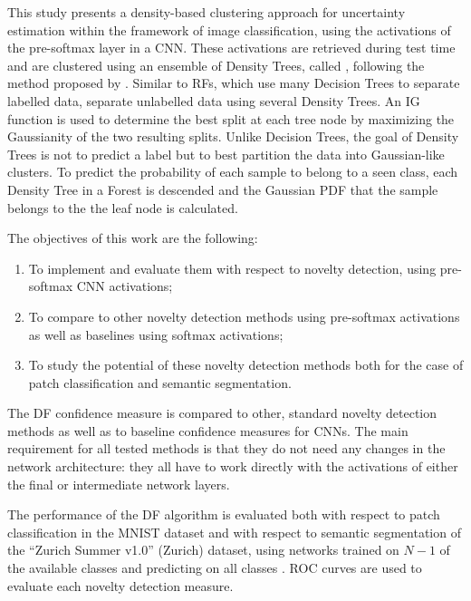 \documentclass[10pt]{article}
\begin{document}
This study presents a density-based clustering approach for uncertainty estimation within the framework of image classification, using the activations of the pre-softmax layer in a CNN. These activations are retrieved during test time and are clustered using an ensemble of Density Trees, called , following the method proposed by \textcite{decisionForests-MSR}. Similar to \glspl{RF}, which use many Decision Trees to separate labelled data,  separate unlabelled data using several Density Trees. An \gls{IG} function is used to determine the best split at each tree node by maximizing the Gaussianity of the two resulting splits. Unlike Decision Trees, the goal of Density Trees is not to predict a label but to best partition the data into Gaussian-like clusters. To predict the probability of each sample to belong to a seen class, each Density Tree in a Forest is descended and the Gaussian \acrfull{PDF} that the sample belongs to the the leaf node is calculated. 

The objectives of this work are the following:
\begin{enumerate}
    \item To implement  and evaluate them with respect to novelty detection, using pre-softmax \gls{CNN} activations;
    \item To compare  to other novelty detection methods using pre-softmax activations as well as baselines using softmax activations;
    \item To study the potential of these novelty detection methods both for the case of patch classification and semantic segmentation.
\end{enumerate}

The \acrlong{DF} confidence measure is compared to other, standard novelty detection methods as well as to baseline confidence measures for \glspl{CNN}. The main requirement for all tested methods is that they do not need any changes in the network architecture: they all have to work directly with the activations of either the final or intermediate network layers.

The performance of the \acrlong{DF} algorithm is evaluated both with respect to patch classification in the \gls{MNIST} dataset and with respect to semantic segmentation of the ``Zurich Summer v1.0'' (Zurich) dataset, using networks trained on $N-1$ of the available classes and predicting on all classes \cite{mnist, Volpi2015SemanticSO}. \acrfull{ROC} curves are used to evaluate each novelty detection measure.
\end{document}
